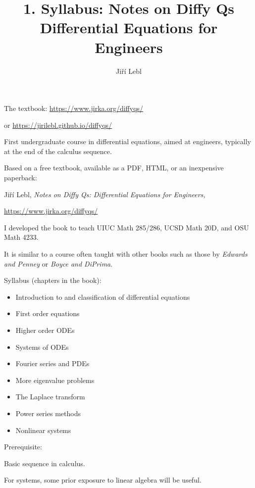 \documentclass[10pt,aspectratio=169]{beamer}
\author{Ji\v{r}\'i Lebl}
\institute[OSU]{%
Oklahoma State University%
}
\title{1. Syllabus: Notes on Diffy Qs\\Differential Equations for Engineers}
\date{}
\begin{document}
\begin{frame}
\titlepage


\begin{center}
The textbook: \url{https://www.jirka.org/diffyqs/}

or \url{https://jirilebl.github.io/diffyqs/}
\end{center}
\end{frame}

\begin{frame}
First undergraduate course in differential equations, aimed at engineers,
typically at the end of the calculus sequence.

\pause
\medskip

Based on a free textbook, available as a PDF, HTML, or an inexpensive
paperback:

\medskip

Ji\v{r}\'i Lebl, \emph{Notes on Diffy Qs: Differential Equations for Engineers,}

\url{https://www.jirka.org/diffyqs/}

\pause
\medskip

I developed the book
to teach UIUC Math 285/286, UCSD Math 20D, and OSU Math 4233.

\pause
\medskip

It is similar to a course often taught with other books such as
those by
\emph{Edwards and Penney} or \emph{Boyce and DiPrima}.

\end{frame}

\begin{frame}
Syllabus (chapters in the book):

\begin{itemize}
\item\pause
Introduction to and classification of differential equations
\item\pause
First order equations
\item\pause
Higher order ODEs
\item\pause
Systems of ODEs
\item\pause
Fourier series and PDEs
\item\pause
More eigenvalue problems
\item\pause
The Laplace transform
\item\pause
Power series methods
\item\pause
Nonlinear systems
\end{itemize}
\end{frame}

\begin{frame}
Prerequisite:

\medskip

Basic sequence in calculus.

\medskip

For systems, some prior exposure to linear algebra will be useful.

\end{frame}
\end{document}
